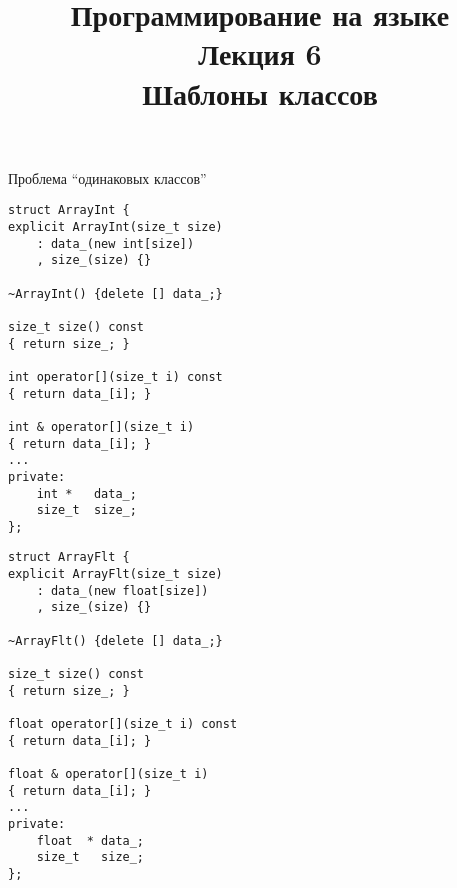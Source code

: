 \documentclass{beamer}
\title{{\bf Программирование на языке \langcpp\protect\\Лекция
6\protect\vspace{1em}\\}Шаблоны классов}
\begin{document}
\begin{frame} 
  \titlepage
\end{frame}

\begin{frame}[fragile]{Проблема ``одинаковых классов''}
\small
\begin{minipage}{.47\textwidth}
    \begin{lstlisting}
struct ArrayInt {
explicit ArrayInt(size_t size) 
    : data_(new int[size])
    , size_(size) {}

~ArrayInt() {delete [] data_;}

size_t size() const 
{ return size_; }

int operator[](size_t i) const 
{ return data_[i]; }

int & operator[](size_t i)       
{ return data_[i]; }
...
private:
    int *   data_;
    size_t  size_;
};
    \end{lstlisting}
\end{minipage}\hspace{.05\textwidth}%
\begin{minipage}{.47\textwidth}
    \begin{lstlisting}
struct ArrayFlt {
explicit ArrayFlt(size_t size) 
    : data_(new float[size])
    , size_(size) {}

~ArrayFlt() {delete [] data_;}

size_t size() const 
{ return size_; }

float operator[](size_t i) const 
{ return data_[i]; }

float & operator[](size_t i)       
{ return data_[i]; }
...
private:
    float  * data_;
    size_t   size_;
};
    \end{lstlisting}
\end{minipage}
\end{frame}
\end{document}
